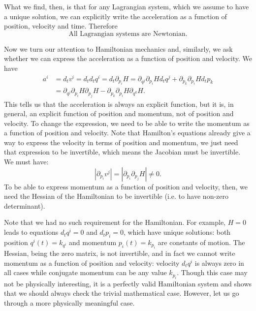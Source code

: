 What we find, then, is that for any Lagrangian system, which we assume to have a unique solution, we can explicitly write the acceleration as a function of position, velocity and time. Therefore
\begin{equation}
	\textrm{All Lagrangian systems are Newtonian.}
\end{equation}

Now we turn our attention to Hamiltonian mechanics and, similarly, we ask whether we can express the acceleration as a function of position and velocity. We have
\begin{equation}
	\begin{aligned}
		a^i &= d_t v^i = d_t d_t q^i = d_t \partial_{p_i} H = \partial_{q^j} \partial_{p_i} H d_t q^j + \partial_{p_k} \partial_{p_i} H d_t p_k \\
		&= \partial_{q^j} \partial_{p_i} H \partial_{p_j} H - \partial_{p_k} \partial_{p_i} H \partial_{q^k} H.
	\end{aligned}
\end{equation}
This tells us that the acceleration is always an explicit function, but it is, in general, an explicit function of position and momentum, not of position and velocity. To change the expression, we need to be able to write the momentum as a function of position and velocity. Note that Hamilton's equations already give a way to express the velocity in terms of position and momentum, we just need that expression to be invertible, which means the Jacobian must be invertible. We must have:
\begin{equation}
	\left|\partial_{p_i} v^j\right| = \left|\partial_{p_i}\partial_{p_j} H\right| \neq 0 .
\end{equation}
To be able to express momentum as a function of position and velocity, then, we need the Hessian of the Hamiltonian to be invertible (i.e. to have non-zero determinant).

Note that we had no such requirement for the Hamiltonian. For example, $H=0$ leads to equations $d_t q^i = 0$ and $d_t p_i = 0$, which have unique solutions: both position $q^i(t) = k_{q^i}$ and momentum $p_i(t) = k_{p_i}$ are constants of motion. The Hessian, being the zero matrix, is not invertible, and in fact we cannot write momentum as a function of position and velocity: velocity $d_t q^i$ is always zero in all cases while conjugate momentum can be any value $k_{p_i}$. Though this case may not be physically interesting, it is a perfectly valid Hamiltonian system and shows that we should always check the trivial mathematical case. However, let us go through a more physically meaningful case.

